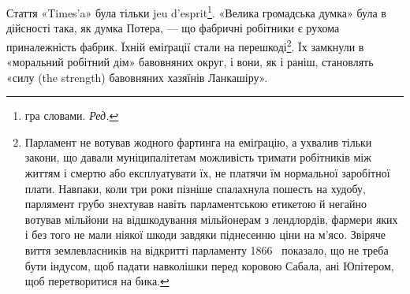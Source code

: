 \enlargethispage{\baselineskip}
Стаття «Times’a» була тільки jeu d’esprit\footnote*{
гра словами. \emph{Ред.}
}. «Велика громадська
думка» була в дійсності така, як думка Потера, — що фабричні
робітники є рухома приналежність фабрик. Їхній еміґрації
стали на перешкоді\footnote{
Парламент не вотував жодного фартинга на еміґрацію, а ухвалив
тільки закони, що давали муніципалітетам можливість тримати робітників
між життям і смертю або експлуатувати їх, не платячи їм нормальної
заробітної плати. Навпаки, коли три роки пізніше спалахнула пошесть
на худобу, парлямент грубо знехтував навіть парламентською етикетою й
негайно вотував мільйони на відшкодування мільйонерам з лендлордів,
фармери яких і без того не мали ніякої шкоди завдяки піднесенню ціни
на м’ясо. Звіряче виття землевласників на відкритті парламенту 1866~
показало, що не треба бути індусом, щоб падати навколішки перед коровою
Сабала, ані Юпітером, щоб перетворитися на бика.
}. Їх замкнули в «моральний робітний
дім» бавовняних округ, і вони, як і раніш, становлять «силу
(the strength) бавовняних хазяїнів Ланкашіру».

